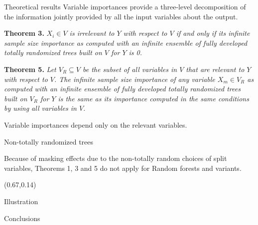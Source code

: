 \documentclass[final]{beamer}
\newcommand{\cmark}{\ding{51}}%
\newcommand{\xmark}{\ding{55}}%
\begin{document}
\begin{frame}{}
\begin{textblock}{0.32}
\begin{block}{Theoretical results \phantom{p}}
{\color{green} \cmark} Variable importances provide a three-level decomposition
of the information jointly provided by all the input variables about the output.

\vspace{0.3cm}

\textbf{Theorem 3.}
\textit{$X_i \in V$ is irrelevant to $Y$ with respect to $V$ if and only if  its
infinite sample size importance as computed with an infinite ensemble of fully
developed totally randomized trees built on $V$ for $Y$ is 0.}

\vspace{0.3cm}

\textbf{Theorem 5.}
\textit{Let $V_R \subseteq V$ be the subset of all variables in $V$ that are relevant to $Y$ with
respect to $V$. The infinite sample size importance of any variable $X_m \in
V_R$ as computed with an infinite ensemble of fully developed totally randomized
trees built on $V_R$ for $Y$ is the same as its importance computed in the same conditions by using all variables in $V$.}

\vspace{0.3cm}

{\color{green} \cmark} Variable importances depend only on the relevant
variables.

\end{block}

\begin{block}{Non-totally randomized trees \phantom{p}}

{\color{red} \xmark} Because of masking effects due to the non-totally
random choices of split variables, Theorems 1, 3 and 5 do not apply for Random forests and variants.

\end{block}

\end{textblock}



\begin{textblock}{0.32}(0.67,0.14)

\begin{block}{Illustration \phantom{p}}

\end{block}

\begin{block}{Conclusions \phantom{p}}

\end{block}

\end{textblock}




\end{frame}
\end{document}
